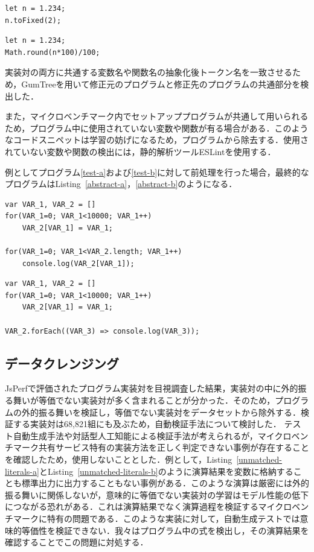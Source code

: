 \documentclass[submit,techrep,noauthor]{ipsj}
\begin{document}
\begin{lstlisting}[caption=Pair of unmatched literals 1, label=unmatched-literals-a,captionpos=t]
let n = 1.234;
n.toFixed(2);
\end{lstlisting}

\begin{lstlisting}[caption=Pair of unmatched literals 2, label=unmatched-literals-b,captionpos=t]
let n = 1.234;
Math.round(n*100)/100;
\end{lstlisting}


実装対の両方に共通する変数名や関数名の抽象化後トークン名を一致させるため，GumTree\cite{Falleri_2014}を用いて修正元のプログラムと修正先のプログラムの共通部分を検出した．

また，マイクロベンチマーク内でセットアッププログラムが共通して用いられるため，プログラム中に使用されていない変数や関数が有る場合がある．このようなコードスニペットは学習の妨げになるため，プログラムから除去する．使用されていない変数や関数の検出には，静的解析ツールESLintを使用する．

例としてプログラム\ref{test-a}および\ref{test-b}に対して前処理を行った場合，最終的なプログラムはListing~\ref{abstract-a}，\ref{abstract-b}のようになる．


\begin{lstlisting}[caption=Abstracted Program 1, label=abstract-a,captionpos=t]
var VAR_1, VAR_2 = []
for(VAR_1=0; VAR_1<10000; VAR_1++)
    VAR_2[VAR_1] = VAR_1;

for(VAR_1=0; VAR_1<VAR_2.length; VAR_1++)
    console.log(VAR_2[VAR_1]);
\end{lstlisting}

\begin{lstlisting}[caption=Abstracted Program 2, label=abstract-b,captionpos=t]
var VAR_1, VAR_2 = []
for(VAR_1=0; VAR_1<10000; VAR_1++)
    VAR_2[VAR_1] = VAR_1;

VAR_2.forEach((VAR_3) => console.log(VAR_3));
\end{lstlisting}


\subsection{データクレンジング}\label{subsec:clean}
JsPerfで評価されたプログラム実装対を目視調査した結果，実装対の中に外的振る舞いが等価でない実装対が多く含まれることが分かった．そのため，プログラムの外的振る舞いを検証し，等価でない実装対をデータセットから除外する．検証する実装対は68,821組にも及ぶため，自動検証手法について検討した．
テスト自動生成手法や対話型人工知能による検証手法が考えられるが，マイクロベンチマーク共有サービス特有の実装方法を正しく判定できない事例が存在することを確認したため，使用しないこととした．例として，Listing~\ref{unmatched-literals-a}とListing~\ref{unmatched-literals-b}のように演算結果を変数に格納することも標準出力に出力することもない事例がある．このような演算は厳密には外的振る舞いに関係しないが，意味的に等価でない実装対の学習はモデル性能の低下につながる恐れがある．これは演算結果でなく演算過程を検証するマイクロベンチマークに特有の問題である．このような実装に対して，自動生成テストでは意味的等価性を検証できない．我々はプログラム中の式を検出し，その演算結果を確認することでこの問題に対処する．
\end{document}
